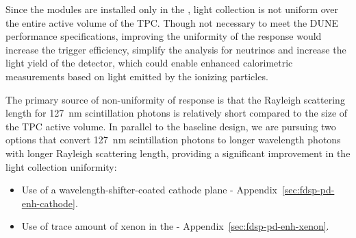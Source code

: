 

Since the  modules are installed only in the , light collection is not uniform over the entire active volume of the TPC. 
Though not necessary to meet the DUNE performance specifications, improving the uniformity of the response would increase the trigger efficiency, simplify the analysis for  neutrinos and increase the light yield of the detector, which could enable enhanced calorimetric measurements based on light emitted by the ionizing particles.

The primary source of non-uniformity of response is that the Rayleigh scattering length for \SI{127}{nm} scintillation photons is relatively short compared to the size of the TPC active volume.   
In parallel to the baseline design, we are pursuing two options that convert \SI{127}{nm} scintillation photons to longer wavelength photons with longer Rayleigh scattering length, providing a significant improvement in the light collection uniformity:

\begin{itemize}
\item Use of a wavelength-shifter-coated cathode plane - Appendix~\ref{sec:fdsp-pd-enh-cathode}.
\item Use of trace amount of xenon in the  - Appendix~\ref{sec:fdsp-pd-enh-xenon}.
\end{itemize}



